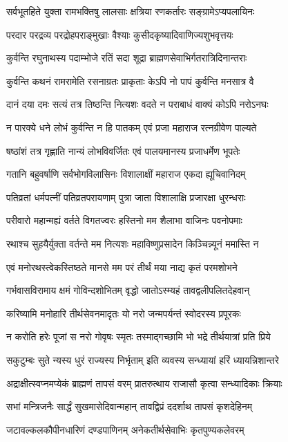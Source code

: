 \twolineshloka
{सर्वभूतहिते युक्ता रामभक्तिषु लालसाः}
{क्षत्रिया रणकर्तारः सङ्ग्रामेऽप्यपलायिनः}%

\twolineshloka
{परदार परद्रव्य परद्रोहपराङ्मुखाः}
{वैश्याः कुसीदकृष्यादिवाणिज्यशुभवृत्तयः}%

\twolineshloka
{कुर्वन्ति रघुनाथस्य पदाम्भोजे रतिं सदा}
{शूद्रा ब्राह्मणसेवाभिर्गतरात्रिदिनान्तराः}%

\twolineshloka
{कुर्वन्ति कथनं रामरामेति रसनाग्रतः}
{प्राकृताः केऽपि नो पापं कुर्वन्ति मनसात्र वै}%

\twolineshloka
{दानं दया दमः सत्यं तत्र तिष्ठन्ति नित्यशः}
{वदते न पराबाधं वाक्यं कोऽपि नरोऽनघः}%

\twolineshloka
{न पारक्ये धने लोभं कुर्वन्ति न हि पातकम्}
{एवं प्रजा महाराज रत्नग्रीवेण पाल्यते}%

\twolineshloka
{षष्ठांशं तत्र गृह्णाति नान्यं लोभविवर्जितः}
{एवं पालयमानस्य प्रजाधर्मेण भूपतेः}%

\twolineshloka
{गतानि बहुवर्षाणि सर्वभोगविलासिनः}
{विशालाक्षीं महाराज एकदा ह्यूचिवानिदम्}%

\twolineshloka
{पतिव्रतां धर्मपत्नीं पतिव्रतपरायणाम्}
{पुत्रा जाता विशालाक्षि प्रजारक्षा धुरन्धराः}%

\twolineshloka
{परीवारो महान्मह्यं वर्तते विगतज्वरः}
{हस्तिनो मम शैलाभा वाजिनः पवनोपमाः}%

\twolineshloka
{रथाश्च सुहयैर्युक्ता वर्तन्ते मम नित्यशः}
{महाविष्णुप्रसादेन किञ्चिन्न्यूनं ममास्ति न}%

\twolineshloka
{एवं मनोरथस्त्वेकस्तिष्ठते मानसे मम}
{परं तीर्थं मया नाद्य कृतं परमशोभने}%

\twolineshloka
{गर्भवासविरामाय क्षमं गोविन्दशोभितम्}
{वृद्धो जातोऽस्म्यहं तावद्वलीपलितदेहवान्}%

\twolineshloka
{करिष्यामि मनोहारि तीर्थसेवनमादृतः}
{यो नरो जन्मपर्यन्तं स्वोदरस्य प्रपूरकः}%

\twolineshloka
{न करोति हरेः पूजां स नरो गोवृषः स्मृतः}
{तस्माद्गच्छामि भो भद्रे तीर्थयात्रां प्रति प्रिये}%

\twolineshloka
{सकुटुम्बः सुते न्यस्य धुरं राज्यस्य निर्भृताम्}
{इति व्यवस्य सन्ध्यायां हरिं ध्यायन्निशान्तरे}%

\twolineshloka
{अद्राक्षीत्स्वप्नमप्येकं ब्राह्मणं तापसं वरम्}
{प्रातरुत्थाय राजासौ कृत्वा सन्ध्यादिकाः क्रियाः}%

\twolineshloka
{सभां मन्त्रिजनैः सार्द्धं सुखमासेदिवान्महान्}
{तावद्विप्रं ददर्शाथ तापसं कृशदेहिनम्}%

\twolineshloka
{जटावल्कलकौपीनधारिणं दण्डपाणिनम्}
{अनेकतीर्थसेवाभिः कृतपुण्यकलेवरम्}%

